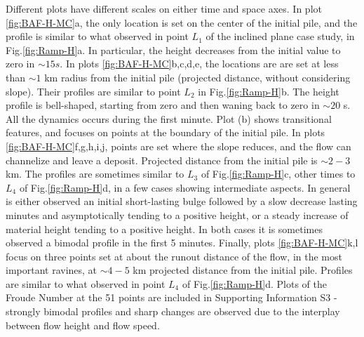 \documentclass{article}
\begin{document}
Different plots have different scales on either time and space axes. In plot \ref{fig:BAF-H-MC}a, the only location is set on the center of the initial pile, and the profile is similar to what observed in point $L_1$ of the inclined plane case study, in Fig.\ref{fig:Ramp-H}a. In particular, the height decreases from the initial value to zero in $\sim 15 s$. In plots \ref{fig:BAF-H-MC}b,c,d,e, the locations are are set at less than $\sim 1$ km radius from the initial pile (projected distance, without considering slope). Their profiles are similar to point $L_2$ in Fig.\ref{fig:Ramp-H}b. The height profile is bell-shaped, starting from zero and then waning back to zero in $\sim 20$ s. All the dynamics occurs during the first minute. Plot (b) shows transitional features, and focuses on points at the boundary of the initial pile. In plots \ref{fig:BAF-H-MC}f,g,h,i,j, points are set where the slope reduces, and the flow can channelize and leave a deposit. Projected distance from the initial pile is $\sim 2-3$ km. The profiles are sometimes similar to $L_3$ of Fig.\ref{fig:Ramp-H}c, other times to $L_4$ of Fig.\ref{fig:Ramp-H}d, in a few cases showing intermediate aspects. In general is either observed an initial short-lasting bulge followed by a slow decrease lasting minutes and asymptotically tending to a positive height, or a steady increase of material height tending to a positive height. In both cases it is sometimes observed a bimodal profile in the first 5 minutes. Finally, plots \ref{fig:BAF-H-MC}k,l focus on three points set at about the runout distance of the flow, in the most important ravines, at $\sim 4-5$ km projected distance from the initial pile. Profiles are similar to what observed in point $L_4$ of Fig.\ref{fig:Ramp-H}d. Plots of the Froude Number at the 51 points are included in Supporting Information S3 - strongly bimodal profiles and sharp changes are observed due to the interplay between flow height and flow speed.
\end{document}
